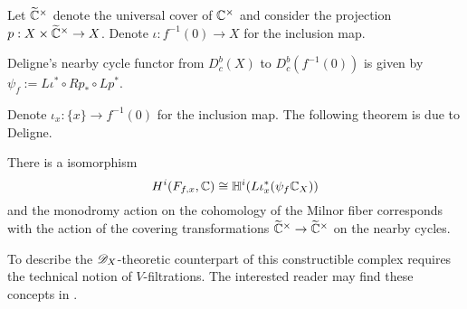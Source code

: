 Let $\widetilde{\mathbb{C}}^\times$ denote the universal cover of $\mathbb{C}^\times$ and consider the projection $p:X\times \widetilde{\mathbb{C}}^\times \to X$.
Denote $\iota:f^{-1}(0)\to X$ for the inclusion map.
\begin{definition}
  Deligne's nearby cycle functor from $D^b_c(X)$ to $D_c^b(f^{-1}(0))$ is given by $\psi_f:= L\iota^* \circ Rp_*\circ Lp^*$.
\end{definition}
Denote $\iota_x:\{x\}\to f^{-1}(0)$ for the inclusion map.
The following theorem is due to Deligne.
\begin{theorem}{\cite{budur2015bernstein}}
  There is a isomorphism
  $$H^i(F_{f,x}, \mathbb{C}) \cong \mathbb{H}^i(L\iota_x^* (\psi_f \mathbb{C}_X)) $$
  and the monodromy action on the cohomology of the Milnor fiber corresponds with the action of the covering transformations $\widetilde{\mathbb{C}}^\times \to \widetilde{\mathbb{C}}^\times$ on the nearby cycles.
\end{theorem}
To describe the $\mathscr{D}_X$-theoretic counterpart of this constructible complex requires the technical notion of $V$-filtrations.
The interested reader may find these concepts in \cite{budur2015bernstein}.
